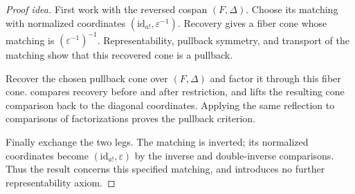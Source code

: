 \documentclass[11pt]{article}
\begin{document}
\begin{proof}[Proof idea]
First work with the reversed cospan $(F,\Delta)$. Choose its matching
with normalized coordinates $(\mathrm{id}_{a!},\varepsilon^{-1})$.
Recovery gives a fiber cone whose matching is
$(\varepsilon^{-1})^{-1}$. Representability, pullback symmetry, and
transport of the matching show that this recovered cone is a pullback.

Recover the chosen pullback cone over $(F,\Delta)$ and factor it through
this fiber cone.  compares
recovery before and after restriction, and
 lifts the resulting cone
comparison back to the diagonal coordinates. Applying the same reflection
to comparisons of factorizations proves the pullback criterion.

Finally exchange the two legs. The matching is inverted; its normalized
coordinates become $(\mathrm{id}_{a!},\varepsilon)$ by the inverse and
double-inverse comparisons. Thus the result concerns this specified
matching, and introduces no further representability axiom.
\end{proof}
\end{document}
